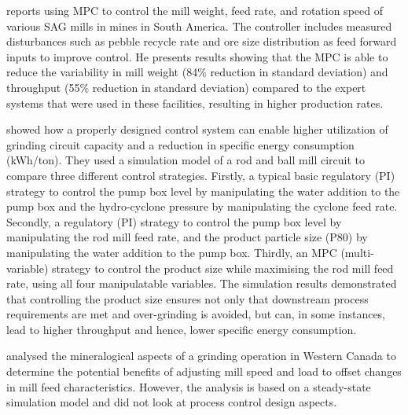 \cite{gough_sag_2015} reports using MPC to control the mill weight, feed rate, and rotation speed of various SAG mills in mines in South America. The controller includes measured disturbances such as pebble recycle rate and ore size distribution as feed forward inputs to improve control. He presents results showing that the MPC is able to reduce the variability in mill weight (84\% reduction in standard deviation) and throughput (55\% reduction in standard deviation) compared to the expert systems that were used in these facilities, resulting in higher production rates.

\cite{bouchard_reducing_2017} showed how a properly designed control system can enable higher utilization of grinding circuit capacity and a reduction in specific energy consumption (kWh/ton). They used a simulation model of a rod and ball mill circuit to compare three different control strategies. Firstly, a typical basic regulatory (PI) strategy to control the pump box level by manipulating the water addition to the pump box and the hydro-cyclone pressure by manipulating the cyclone feed rate. Secondly, a regulatory (PI) strategy to control the pump box level by manipulating the rod mill feed rate, and the product particle size (P80) by manipulating the water addition to the pump box. Thirdly, an MPC (multi-variable) strategy to control the product size while maximising the rod mill feed rate, using all four manipulatable variables. The simulation results demonstrated that controlling the product size ensures not only that downstream process requirements are met and over-grinding is avoided, but can, in some instances, lead to higher throughput and hence, lower specific energy consumption.

\cite{liu_development_2018} analysed the mineralogical aspects of a grinding operation in Western Canada to determine the potential benefits of adjusting mill speed and load to offset changes in mill feed characteristics. However, the analysis is based on a steady-state simulation model and did not look at process control design aspects.


%

